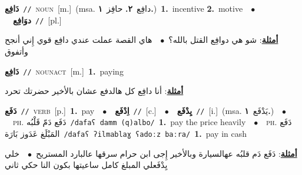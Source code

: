 \documentclass[10pt,a4paper,twoside]{article} %
\begin{document}
\begin{multicols}{2}
{\setlength\topsep{0pt}\textbf{\foreignlanguage{arabic}{دَافِع}}\ {\color{gray}\texttt{//}\color{black}}\ \textsc{noun}\ [m.]\ \color{gray}(msa. \foreignlanguage{arabic}{دافِع}~\foreignlanguage{arabic}{\textbf{٢.}}  \foreignlanguage{arabic}{حافِز}~\foreignlanguage{arabic}{\textbf{١.}})\color{black}\ \textbf{1.}~incentive  \textbf{2.}~motive\ \ $\bullet$\ \ \setlength\topsep{0pt}\textbf{\foreignlanguage{arabic}{دوَافِع}}\ {\color{gray}\texttt{//}\color{black}}\ [pl.]\  \begin{flushright}\color{gray}\foreignlanguage{arabic}{\textbf{\underline{\foreignlanguage{arabic}{أمثلة}}}: شو هي دوافِع القتل بالله؟\ $\bullet$\ \  هاي القصة عملت عندي دافِع قوي إِني أنجح وأتفوق}\end{flushright}\color{black}} \vspace{2mm}

{\setlength\topsep{0pt}\textbf{\foreignlanguage{arabic}{دَافِع}}\ {\color{gray}\texttt{//}\color{black}}\ \textsc{noun\textunderscore act}\ [m.]\ \textbf{1.}~paying\  \begin{flushright}\color{gray}\foreignlanguage{arabic}{\textbf{\underline{\foreignlanguage{arabic}{أمثلة}}}: أنا دافِع كل هالدفع عشان بالأخير حضرتك تحرد}\end{flushright}\color{black}} \vspace{2mm}

{\setlength\topsep{0pt}\textbf{\foreignlanguage{arabic}{دَفَع}}\ {\color{gray}\texttt{//}\color{black}}\ \textsc{verb}\ [p.]\ \textbf{1.}~pay\ \ $\bullet$\ \ \setlength\topsep{0pt}\textbf{\foreignlanguage{arabic}{اِدْفَع}}\ {\color{gray}\texttt{//}\color{black}}\ [c.]\ \ $\bullet$\ \ \setlength\topsep{0pt}\textbf{\foreignlanguage{arabic}{يِدْفَع}}\ {\color{gray}\texttt{//}\color{black}}\ [i.]\ \color{gray}(msa. \foreignlanguage{arabic}{يَدْفَع}~\foreignlanguage{arabic}{\textbf{١.}})\color{black}\ \ $\bullet$\ \ \textsc{ph.} \color{gray} \foreignlanguage{arabic}{دَفَع دَمّ قَلْبُه}\color{black}\ {\color{gray}\texttt{/{\sffamily dafaʕ damm (q)albo}/}\color{black}}\ \textbf{1.}~pay the price heavily\ \ $\bullet$\ \ \textsc{ph.} \color{gray} \foreignlanguage{arabic}{دَفَع المَبْلَغ عَدَوز بَارَة}\color{black}\ {\color{gray}\texttt{/{\sffamily dafaʕ ʔilmablaɣ ʕadoːz baːra}/}\color{black}}\ \textbf{1.}~pay in cash\  \begin{flushright}\color{gray}\foreignlanguage{arabic}{\textbf{\underline{\foreignlanguage{arabic}{أمثلة}}}: دَفَع دَم قلبُه عهالسيارة وبالأخير إِجى ابن حرام سرقها عالبارد المستريح\ $\bullet$\ \  خلي يِدْفَعلي المبلغ كامل ساعيتها بكون النا حكي ثاني}\end{flushright}\color{black}} \vspace{2mm}


\end{multicols}
\end{document}
